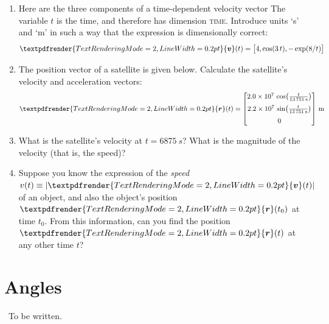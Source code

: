 \documentclass[a4paper,12pt,%
onecolumn,oneside,%
british%
]{memoir}
\renewcommand*{\bm}[1]{\textpdfrender{TextRenderingMode=2,LineWidth=0.2pt}{\boldsymbol{#1}}}
\newcommand{\mynotew}[1]{{\footnotesize\color{midgrey}\faIcon{tools}\ #1}}
\DeclarePairedDelimiter\abs{\lvert}{\rvert}
\renewcommand*{\|}[1][]{\nonscript\:#1\vert\nonscript\:\mathopen{}}
\newcommand*{\yr}{\bm{r}}
\newcommand*{\yv}{\bm{v}}
\newcommand*{\yti}{t_{0}}
\begin{document}
\begin{exercise}
  \begin{enumerate}[exerc]
  \item Here are the three components of a time-dependent velocity vector The variable $t$ is the time, and therefore has dimension \textsc{time}. Introduce units \enquote*{\unit{s}} and \enquote*{\unit{m}}  in such a way that the expression is dimensionally correct:
    \begin{equation*}
      \bm{v}(t) = \bigl[4, \cos(3\,t), -\exp(8/t)\bigr]
    \end{equation*}
  \item The position vector of a satellite is given below. Calculate the satellite's velocity and acceleration vectors:
    \begin{equation*}
      \yr(t) =
      \begin{bmatrix}
        \num[exponent-mode=scientific]{20e6}\,
        \cos\bigl(\frac{t}{\qty{13751}{s}}\bigr)\\[2\jot]
        \num[exponent-mode=scientific]{22e6}\,
        \sin\bigl(\frac{t}{\qty{13751}{s}}\bigr)\\[2\jot]
        \num{0}
      \end{bmatrix}\,\unit{m}
    \end{equation*}
  \item What is the satellite's velocity at $t=\qty{6875}{s}$? What is the magnitude of the velocity (that is, the speed)?

  \item Suppose you know the expression of the \emph{speed} $v(t) \equiv \abs{\yv(t)}$ of an object, and also the object's position $\yr(\yti)$ at time $\yti$. From this information, can you find the position $\yr(t)$ at any other time $t$?
  \end{enumerate}
\end{exercise}



\section{Angles}
\label{sec:angles}

\mynotew{To be written.}
\end{document}
